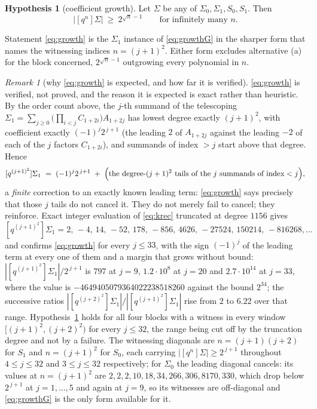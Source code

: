 \documentclass[11pt]{article}
\theoremstyle{plain}
\theoremstyle{definition}
\newtheorem{hypothesis}[theorem]{Hypothesis}
\theoremstyle{remark}
\newtheorem{remark}[theorem]{Remark}
\begin{document}
\begin{hypothesis}[coefficient growth]\label{hyp:growth}
Let $\Sigma$ be any of $\Sigma_0,\Sigma_1,S_0,S_1$. Then
\begin{equation}\label{eq:growthG}
   \bigl|[q^{n}]\Sigma\bigr|\ \ge\ 2^{\sqrt n-1}\qquad\text{for infinitely many }n .
\end{equation}
\end{hypothesis}

\noindent Statement \eqref{eq:growth} is the $\Sigma_1$ instance of \eqref{eq:growthG} in the
sharper form that names the witnessing indices $n=(j+1)^2$. Either form excludes alternative
\textup{(a)} for the block concerned, $2^{\sqrt n-1}$ outgrowing every polynomial in $n$.

\begin{remark}[why \eqref{eq:growth} is expected, and how far it is verified]\label{rem:growthstatus}
\eqref{eq:growth} is verified, not proved, and the reason it is expected is exact rather than
heuristic. By the order count above, the $j$-th summand of the telescoping
$\Sigma_1=\sum_{j\ge0}\bigl(\prod_{i<j}C_{1+2i}\bigr)A_{1+2j}$ has lowest degree exactly $(j+1)^2$,
with coefficient exactly $(-1)^j2^{\,j+1}$ (the leading $2$ of $A_{1+2j}$ against the leading $-2$
of each of the $j$ factors $C_{1+2i}$), and summands of index $>j$ start above that degree.
Hence
\[
   [q^{(j+1)^2}]\Sigma_1\;=\;(-1)^j2^{\,j+1}\;+\;\Bigl(\text{the degree-}(j+1)^2\text{ tails of the
   $j$ summands of index}<j\Bigr),
\]
a \emph{finite} correction to an exactly known leading term: \eqref{eq:growth} says precisely that
those $j$ tails do not cancel it. They do not merely fail to cancel; they reinforce. Exact integer
evaluation of \eqref{eq:krec} truncated at degree $1156$ gives
\[
   [q^{(j+1)^2}]\Sigma_1=2,\,-4,\,14,\,-52,\,178,\,-856,\,4626,\,-27524,\,150214,\,-816268,\dots
\]
and confirms \eqref{eq:growth} for every $j\le33$, with the sign $(-1)^j$ of the leading term at
every one of them and a margin that grows without bound: $|[q^{(j+1)^2}]\Sigma_1|/2^{\,j+1}$ is
$797$ at $j=9$, $1.2\cdot10^8$ at $j=20$ and $2.7\cdot10^{14}$ at $j=33$, where the value is
$-4649405079364022238518260$ against the bound $2^{34}$; the successive ratios
$|[q^{(j+2)^2}]\Sigma_1|/|[q^{(j+1)^2}]\Sigma_1|$ rise from $2$ to $6.22$ over that range.
Hypothesis~\ref{hyp:growth} holds for all four blocks with a witness in every window
$[(j+1)^2,(j+2)^2)$ for every $j\le32$, the range being cut off by the truncation degree and not by
a failure. The witnessing diagonals are $n=(j+1)(j+2)$ for $S_1$ and $n=(j+1)^2$ for $S_0$, each
carrying $|[q^n]\Sigma|\ge2^{\,j+1}$ throughout $4\le j\le32$ and $3\le j\le32$ respectively; for
$\Sigma_0$ the leading diagonal cancels: its values at $n=(j+1)^2$ are
$2,2,2,10,18,34,266,306,8170,330$, which drop below $2^{\,j+1}$ at $j=1,\dots,5$ and again at
$j=9$, so its witnesses are off-diagonal and \eqref{eq:growthG} is the only form available for it.


\end{remark}
\end{document}
